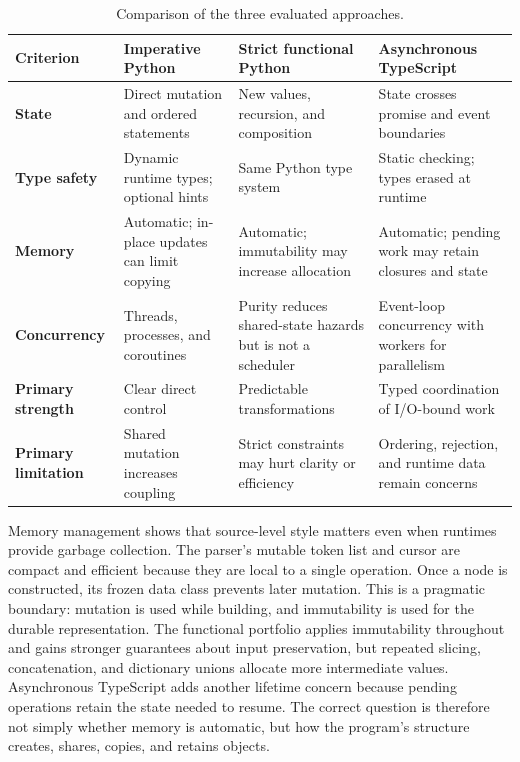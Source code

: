 \documentclass[12pt]{article}
\begin{document}
\begin{table}[htbp]
\centering
\small
\begin{tabularx}{\textwidth}{>{\bfseries}p{}YYY}
\toprule
Criterion & Imperative Python & Strict functional Python & Asynchronous TypeScript \\
\midrule
State & Direct mutation and ordered statements & New values, recursion, and composition & State crosses promise and event boundaries \\
Type safety & Dynamic runtime types; optional hints & Same Python type system & Static checking; types erased at runtime \\
Memory & Automatic; in-place updates can limit copying & Automatic; immutability may increase allocation & Automatic; pending work may retain closures and state \\
Concurrency & Threads, processes, and coroutines & Purity reduces shared-state hazards but is not a scheduler & Event-loop concurrency with workers for parallelism \\
Primary strength & Clear direct control & Predictable transformations & Typed coordination of I/O-bound work \\
Primary limitation & Shared mutation increases coupling & Strict constraints may hurt clarity or efficiency & Ordering, rejection, and runtime data remain concerns \\
\bottomrule
\end{tabularx}
\caption{Comparison of the three evaluated approaches.}
\end{table}

Memory management shows that source-level style matters even when runtimes provide garbage collection. The parser's mutable token list and cursor are compact and efficient because they are local to a single operation. Once a node is constructed, its frozen data class prevents later mutation. This is a pragmatic boundary: mutation is used while building, and immutability is used for the durable representation. The functional portfolio applies immutability throughout and gains stronger guarantees about input preservation, but repeated slicing, concatenation, and dictionary unions allocate more intermediate values. Asynchronous TypeScript adds another lifetime concern because pending operations retain the state needed to resume. The correct question is therefore not simply whether memory is automatic, but how the program's structure creates, shares, copies, and retains objects.
\end{document}
